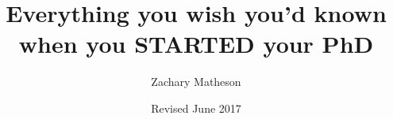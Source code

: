 \documentclass[a4paper,12pt]{book}
\begin{document}
\author{Zachary Matheson}
\title{Everything you wish you'd known when you STARTED your PhD}
\date{Revised June 2017}

\frontmatter
\maketitle
\tableofcontents

\mainmatter

\backmatter


\end{document}
